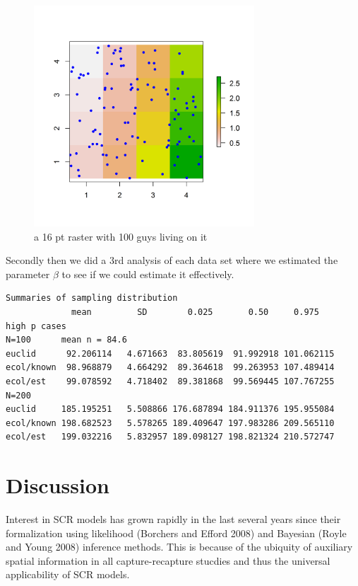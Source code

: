 \begin{figure}
\begin{center}
\includegraphics[height=3.25in,width=3.25in]{Ch10/figs/raster_withN100}
\end{center}
\caption{a 16 pt raster with 100 guys living on it}
\label{ecoldist.fig.raster100}
\end{figure}


Secondly then we did a 3rd analysis of each 
data set where we estimated the parameter $\beta$ to see if we could estimate
it effectively. 


\begin{verbatim}
Summaries of sampling distribution
             mean         SD        0.025       0.50     0.975
high p cases  
N=100      mean n = 84.6
euclid      92.206114   4.671663  83.805619  91.992918 101.062115 
ecol/known  98.968879   4.664292  89.364618  99.263953 107.489414 
ecol/est    99.078592   4.718402  89.381868  99.569445 107.767255 
N=200
euclid     185.195251   5.508866 176.687894 184.911376 195.955084 
ecol/known 198.682523   5.578265 189.409647 197.983286 209.565110 
ecol/est   199.032216   5.832957 189.098127 198.821324 210.572747 

\end{verbatim}


\section{Discussion}

Interest in SCR models has grown rapidly in the last several years since 
their formalization using likelihood (Borchers and Efford 2008) and 
Bayesian (Royle and Young 2008) inference methods. This is because of the 
ubiquity of auxiliary spatial information in all capture-recapture stucdies 
and thus the universal applicability of SCR models. 

